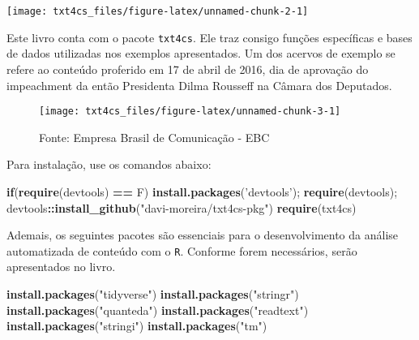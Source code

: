 \documentclass[]{book}
\newenvironment{Shaded}{\begin{snugshade}}{\end{snugshade}}
\newcommand{\ControlFlowTok}[1]{\textcolor[rgb]{0.13,0.29,0.53}{\textbf{#1}}}
\newcommand{\KeywordTok}[1]{\textcolor[rgb]{0.13,0.29,0.53}{\textbf{#1}}}
\newcommand{\NormalTok}[1]{#1}
\newcommand{\OperatorTok}[1]{\textcolor[rgb]{0.81,0.36,0.00}{\textbf{#1}}}
\newcommand{\StringTok}[1]{\textcolor[rgb]{0.31,0.60,0.02}{#1}}
\begin{document}
\begin{center}\texttt{[image: txt4cs\_files/figure-latex/unnamed-chunk-2-1]} \end{center}

Este livro conta com o pacote \texttt{txt4cs}. Ele traz consigo funções específicas e bases de dados utilizadas nos exemplos apresentados. Um dos acervos de exemplo se refere ao conteúdo proferido em 17 de abril de 2016, dia de aprovação do impeachment da então Presidenta Dilma Rousseff na Câmara dos Deputados.

\begin{figure}

{\centering \texttt{[image: txt4cs\_files/figure-latex/unnamed-chunk-3-1]} 

}

\caption{Fonte: Empresa Brasil de Comunicação - EBC}\label{fig:unnamed-chunk-3}
\end{figure}

Para instalação, use os comandos abaixo:

\begin{Shaded}
\begin{Highlighting}[]
\ControlFlowTok{if}\NormalTok{(}\KeywordTok{require}\NormalTok{(devtools) }\OperatorTok{==}\StringTok{ }\NormalTok{F) }\KeywordTok{install.packages}\NormalTok{(}\StringTok{'devtools'}\NormalTok{); }\KeywordTok{require}\NormalTok{(devtools);}
\NormalTok{devtools}\OperatorTok{::}\KeywordTok{install_github}\NormalTok{(}\StringTok{"davi-moreira/txt4cs-pkg"}\NormalTok{)}
\KeywordTok{require}\NormalTok{(txt4cs)}
\end{Highlighting}
\end{Shaded}

Ademais, os seguintes pacotes são essenciais para o desenvolvimento da análise automatizada de conteúdo com o \texttt{R}. Conforme forem necessários, serão apresentados no livro.

\begin{Shaded}
\begin{Highlighting}[]
\KeywordTok{install.packages}\NormalTok{(}\StringTok{"tidyverse"}\NormalTok{)}
\KeywordTok{install.packages}\NormalTok{(}\StringTok{"stringr"}\NormalTok{)}
\KeywordTok{install.packages}\NormalTok{(}\StringTok{"quanteda"}\NormalTok{)}
\KeywordTok{install.packages}\NormalTok{(}\StringTok{"readtext"}\NormalTok{)}
\KeywordTok{install.packages}\NormalTok{(}\StringTok{"stringi"}\NormalTok{)}
\KeywordTok{install.packages}\NormalTok{(}\StringTok{"tm"}\NormalTok{)}
\end{Highlighting}
\end{Shaded}
\end{document}

